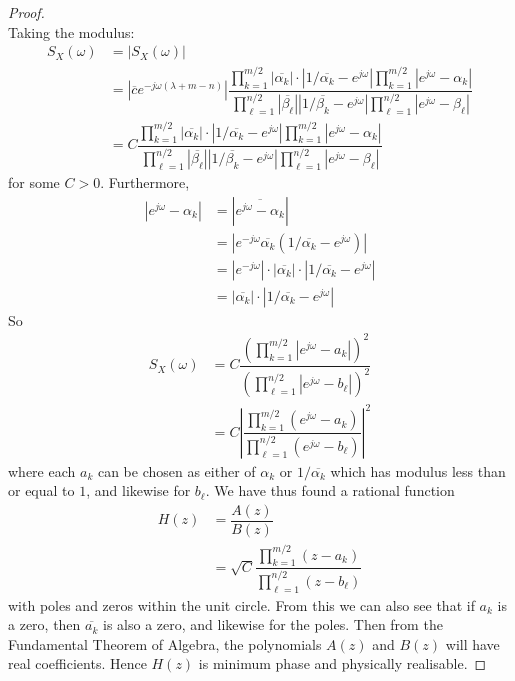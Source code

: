 \documentclass[11pt]{report} %
\begin{document}
\begin{proof}
\begin{equation}
\end{equation}
Taking the modulus:
\begin{align}
S_{X}\left(\omega\right) &= \left|S_{X}\left(\omega\right)\right| \\
&= \left|\overline{c}e^{-j\omega\left(\lambda + m - n\right)}\right|\dfrac{\prod_{k = 1}^{m/2}\left|\overline{\alpha_{k}}\right|\cdot\left|1/\overline{\alpha_{k}} - e^{j\omega}\right|\prod_{k = 1}^{m/2}\left|e^{j\omega} - \alpha_{k}\right|}{\prod_{\ell = 1}^{n/2}\left|\overline{\beta_{\ell}}\right|\left|1/\overline{\beta_{k}} - e^{j\omega}\right|\prod_{\ell = 1}^{n/2}\left|e^{j\omega} - \beta_{\ell}\right|} \\
&= C\dfrac{\prod_{k = 1}^{m/2}\left|\overline{\alpha_{k}}\right|\cdot\left|1/\overline{\alpha_{k}} - e^{j\omega}\right|\prod_{k = 1}^{m/2}\left|e^{j\omega} - \alpha_{k}\right|}{\prod_{\ell = 1}^{n/2}\left|\overline{\beta_{\ell}}\right|\left|1/\overline{\beta_{k}} - e^{j\omega}\right|\prod_{\ell = 1}^{n/2}\left|e^{j\omega} - \beta_{\ell}\right|}
\end{align}
for some $C > 0$. Furthermore,
\begin{align}
\left|e^{j\omega} - \alpha_{k}\right| &= \left|\overline{e^{j\omega} - \alpha_{k}}\right| \\
&= \left|e^{-j\omega}\overline{\alpha_{k}}\left(1/\overline{\alpha_{k}} - e^{j\omega}\right)\right| \\
&= \left|e^{-j\omega}\right|\cdot\left|\overline{\alpha_{k}}\right|\cdot\left|1/\overline{\alpha_{k}} - e^{j\omega}\right| \\
&= \left|\overline{\alpha_{k}}\right|\cdot\left|1/\overline{\alpha_{k}} - e^{j\omega}\right|
\end{align}
So
\begin{align}
S_{X}\left(\omega\right) &= C\dfrac{\left(\prod_{k = 1}^{m/2}\left|e^{j\omega} - a_{k}\right|\right)^{2}}{\left(\prod_{\ell = 1}^{n/2}\left|e^{j\omega} - b_{\ell}\right|\right)^{2}} \\
&= C\left|\dfrac{\prod_{k = 1}^{m/2}\left(e^{j\omega} - a_{k}\right)}{\prod_{\ell = 1}^{n/2}\left(e^{j\omega} - b_{\ell}\right)}\right|^{2}
\end{align}
where each $a_{k}$ can be chosen as either of $\alpha_{k}$ or $1/\overline{\alpha_{k}}$ which has modulus less than or equal to $1$, and likewise for $b_{\ell}$. We have thus found a rational function
\begin{align}
H\left(z\right) &= \dfrac{A\left(z\right)}{B\left(z\right)} \\
&= \sqrt{C}\dfrac{\prod_{k = 1}^{m/2}\left(z - a_{k}\right)}{\prod_{\ell = 1}^{n/2}\left(z - b_{\ell}\right)}
\end{align}
with poles and zeros within the unit circle. From this we can also see that if $a_{k}$ is a zero, then $\overline{a_{k}}$ is also a zero, and likewise for the poles. Then from the Fundamental Theorem of Algebra, the polynomials $A\left(z\right)$ and $B\left(z\right)$ will have real coefficients. Hence $H\left(z\right)$ is minimum phase and physically realisable.
\end{proof}
\end{document}
